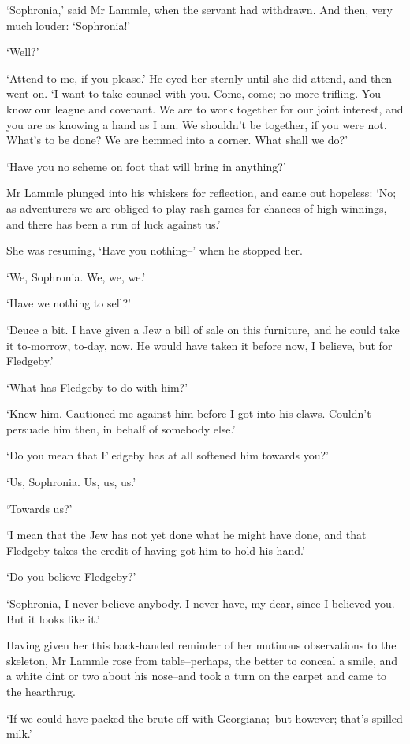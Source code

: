 ‘Sophronia,’ said Mr Lammle, when the servant had withdrawn. And then,
very much louder: ‘Sophronia!’

‘Well?’

‘Attend to me, if you please.’ He eyed her sternly until she did attend,
and then went on. ‘I want to take counsel with you. Come, come; no more
trifling. You know our league and covenant. We are to work together for
our joint interest, and you are as knowing a hand as I am. We shouldn’t
be together, if you were not. What’s to be done? We are hemmed into a
corner. What shall we do?’

‘Have you no scheme on foot that will bring in anything?’

Mr Lammle plunged into his whiskers for reflection, and came out
hopeless: ‘No; as adventurers we are obliged to play rash games for
chances of high winnings, and there has been a run of luck against us.’

She was resuming, ‘Have you nothing--’ when he stopped her.

‘We, Sophronia. We, we, we.’

‘Have we nothing to sell?’

‘Deuce a bit. I have given a Jew a bill of sale on this furniture, and
he could take it to-morrow, to-day, now. He would have taken it before
now, I believe, but for Fledgeby.’

‘What has Fledgeby to do with him?’

‘Knew him. Cautioned me against him before I got into his claws.
Couldn’t persuade him then, in behalf of somebody else.’

‘Do you mean that Fledgeby has at all softened him towards you?’

‘Us, Sophronia. Us, us, us.’

‘Towards us?’

‘I mean that the Jew has not yet done what he might have done, and that
Fledgeby takes the credit of having got him to hold his hand.’

‘Do you believe Fledgeby?’

‘Sophronia, I never believe anybody. I never have, my dear, since I
believed you. But it looks like it.’

Having given her this back-handed reminder of her mutinous observations
to the skeleton, Mr Lammle rose from table--perhaps, the better to
conceal a smile, and a white dint or two about his nose--and took a turn
on the carpet and came to the hearthrug.

‘If we could have packed the brute off with Georgiana;--but however;
that’s spilled milk.’

